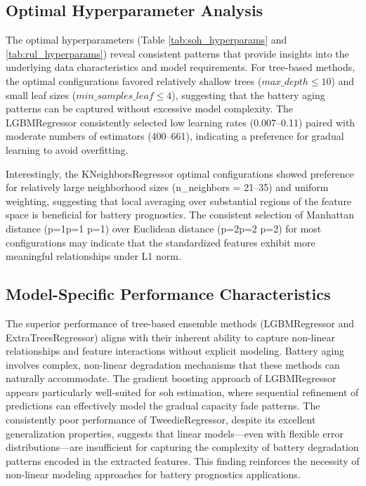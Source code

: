 \subsection{Optimal Hyperparameter Analysis}
The optimal hyperparameters (Table \ref{tab:soh_hyperparams} and \ref{tab:rul_hyperparams}) reveal consistent patterns that provide insights into the underlying data characteristics and model requirements. For tree-based methods, the optimal configurations favored relatively shallow trees ($max\_depth \leq 10$) and small leaf sizes ($min\_samples\_leaf \leq 4$), suggesting that the battery aging patterns can be captured without excessive model complexity. The LGBMRegressor consistently selected low learning rates (0.007--0.11) paired with moderate numbers of estimators (400--661), indicating a preference for gradual learning to avoid overfitting.

Interestingly, the KNeighborsRegressor optimal configurations showed preference for relatively large neighborhood sizes (n\_neighbors = 21--35) and uniform weighting, suggesting that local averaging over substantial regions of the feature space is beneficial for battery prognostics. The consistent selection of Manhattan distance (p=1p=1
p=1) over Euclidean distance (p=2p=2
p=2) for most configurations may indicate that the standardized features exhibit more meaningful relationships under L1 norm.

\subsection{Model-Specific Performance Characteristics}

The superior performance of tree-based ensemble methods (LGBMRegressor and ExtraTreesRegressor) aligns with their inherent ability to capture non-linear relationships and feature interactions without explicit modeling. Battery aging involves complex, non-linear degradation mechanisms that these methods can naturally accommodate. The gradient boosting approach of LGBMRegressor appears particularly well-suited for \ac{soh} estimation, where sequential refinement of predictions can effectively model the gradual capacity fade patterns.
The consistently poor performance of TweedieRegressor, despite its excellent generalization properties, suggests that linear models---even with flexible error distributions---are insufficient for capturing the complexity of battery degradation patterns encoded in the extracted features. This finding reinforces the necessity of non-linear modeling approaches for battery prognostics applications.

